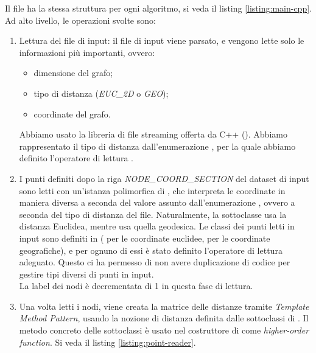 \noindent Il file  ha la stessa struttura per ogni algoritmo, si veda il listing \ref{listing:main-cpp}. Ad alto livello, le operazioni svolte sono:

\begin{enumerate}
    \item Lettura del file di input: il file di input viene parsato, e vengono lette solo le informazioni più importanti, ovvero:
    
    \begin{itemize}
        \item dimensione del grafo;
        \item tipo di distanza (\textit{EUC\_2D} o \textit{GEO});
        \item coordinate del grafo.
    \end{itemize}
    
    \noindent Abbiamo usato la libreria di file streaming offerta da C++ (). Abbiamo rappresentato il tipo di distanza dall'enumerazione , per la quale abbiamo definito l'operatore di lettura .
    
    \item I punti definiti dopo la riga \textit{NODE\_COORD\_SECTION} del dataset di input sono letti con un'istanza polimorfica di , che interpreta le coordinate in maniera diversa a seconda del valore assunto dall'enumerazione , ovvero a seconda del tipo di distanza del file. Naturalmente, la sottoclasse  usa la distanza Euclidea, mentre  usa quella geodesica. Le classi dei punti letti in input sono definiti in  ( per le coordinate euclidee,  per le coordinate geografiche), e per ognuno di essi è stato definito l'operatore di lettura  adeguato. Questo ci ha permesso di non avere duplicazione di codice per gestire tipi diversi di punti in input. \\
    
    \noindent La label dei nodi è decrementata di 1 in questa fase di lettura.
    
    \item Una volta letti i nodi, viene creata la matrice delle distanze tramite \textit{Template Method Pattern}, usando la nozione di distanza definita dalle sottoclassi di . Il metodo concreto  delle sottoclassi è usato nel costruttore di  come \textit{higher-order function}. Si veda il listing \ref{listing:point-reader}.
\end{enumerate}

